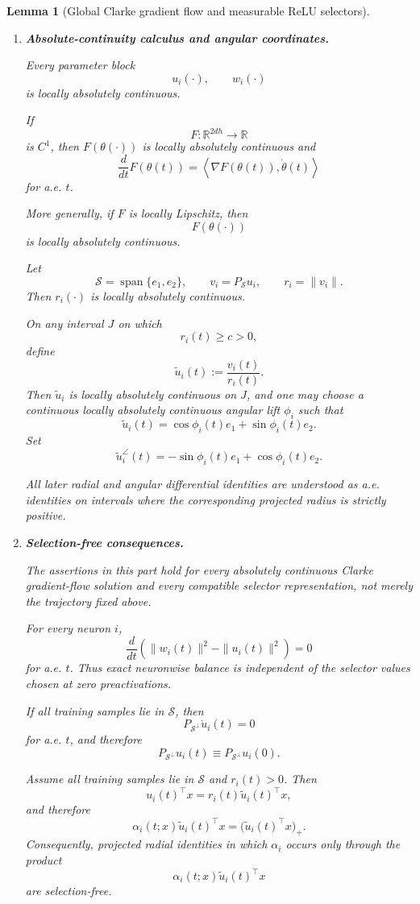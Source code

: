 \documentclass{article} %
\theoremstyle{plain}
\newtheorem{lemma}[theorem]{Lemma}
\theoremstyle{definition}
\theoremstyle{remark}
\begin{document}
\begin{lemma}[Global Clarke gradient flow and measurable ReLU selectors]
\begin{enumerate}[label=(\roman*),leftmargin=2.4em]
\item
\textbf{Absolute-continuity calculus and angular coordinates.}

Every parameter block
\[
u_i(\cdot),
\qquad
w_i(\cdot)
\]
is locally absolutely continuous.

If
\[
F:\mathbb R^{2dh}\to\mathbb R
\]
is $C^1$, then $F(\theta(\cdot))$ is locally absolutely continuous and
\[
\frac{d}{dt}F(\theta(t))
=
\left\langle
\nabla F(\theta(t)),
\dot\theta(t)
\right\rangle
\]
for a.e. $t$.

More generally, if $F$ is locally Lipschitz, then
\[
F(\theta(\cdot))
\]
is locally absolutely continuous.

Let
\[
\mathcal S
=
\operatorname{span}\{e_1,e_2\},
\qquad
v_i=P_{\mathcal S}u_i,
\qquad
r_i=\|v_i\|.
\]
Then $r_i(\cdot)$ is locally absolutely continuous.

On any interval $J$ on which
\[
r_i(t)\ge c>0,
\]
define
\[
\widetilde u_i(t)
:=
\frac{v_i(t)}{r_i(t)}.
\]
Then $\widetilde u_i$ is locally absolutely continuous on $J$, and one may
choose a continuous locally absolutely continuous angular lift $\phi_i$ such
that
\[
\widetilde u_i(t)
=
\cos\phi_i(t)e_1
+
\sin\phi_i(t)e_2.
\]
Set
\[
\widetilde u_i^\angle(t)
=
-\sin\phi_i(t)e_1
+
\cos\phi_i(t)e_2.
\]

All later radial and angular differential identities are understood as a.e.
identities on intervals where the corresponding projected radius is strictly
positive.

\item
\textbf{Selection-free consequences.}

The assertions in this part hold for every absolutely continuous Clarke
gradient-flow solution and every compatible selector representation, not
merely the trajectory fixed above.

For every neuron $i$,
\[
\boxed{
\frac{d}{dt}
\left(
\|w_i(t)\|^2-\|u_i(t)\|^2
\right)
=
0
}
\]
for a.e. $t$. Thus exact neuronwise balance is independent of the selector
values chosen at zero preactivations.

If all training samples lie in $\mathcal S$, then
\[
\boxed{
P_{\mathcal S^\perp}\dot u_i(t)=0
}
\]
for a.e. $t$, and therefore
\[
P_{\mathcal S^\perp}u_i(t)
\equiv
P_{\mathcal S^\perp}u_i(0).
\]

Assume all training samples lie in $\mathcal S$ and $r_i(t)>0$. Then
\[
u_i(t)^\top x
=
r_i(t)\widetilde u_i(t)^\top x,
\]
and therefore
\[
\boxed{
\alpha_i(t;x)
\widetilde u_i(t)^\top x
=
\bigl(
\widetilde u_i(t)^\top x
\bigr)_+.
}
\]
Consequently, projected radial identities in which $\alpha_i$ occurs only
through the product
\[
\alpha_i(t;x)
\widetilde u_i(t)^\top x
\]
are selection-free.


\end{enumerate}
\end{lemma}
\end{document}
